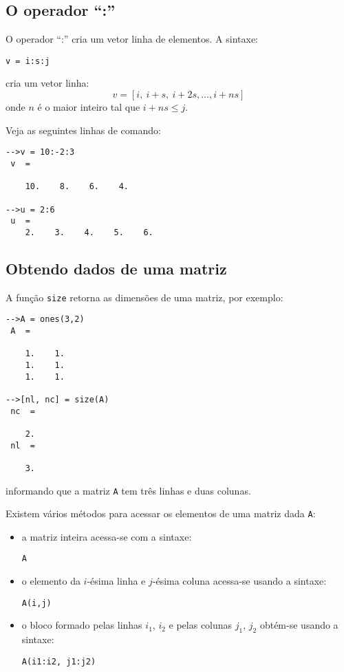 \subsection{O operador ``:''}

O operador ``:'' cria um vetor linha de elementos. A sintaxe:
\begin{verbatim}
v = i:s:j
\end{verbatim}
cria um vetor linha:
\begin{equation}
  v = [i,~i+s,~i+2s,\dotsc, i+ns]
\end{equation}
onde $n$ é o maior inteiro tal que $i + ns \leq j$.

\begin{ex}
Veja as seguintes linhas de comando:
\begin{verbatim}
-->v = 10:-2:3
 v  =
 
    10.    8.    6.    4.  
 
-->u = 2:6
 u  =
    2.    3.    4.    5.    6.
\end{verbatim}
\end{ex}

\subsection{Obtendo dados de uma matriz}

A função \verb+size+ retorna as dimensões de uma matriz, por exemplo:
\begin{verbatim}
-->A = ones(3,2)
 A  =
 
    1.    1.  
    1.    1.  
    1.    1.  
 
-->[nl, nc] = size(A)
 nc  =
 
    2.  
 nl  =
 
    3.  
\end{verbatim}
informando que a matriz \verb+A+ tem três linhas e duas colunas.

Existem vários métodos para acessar os elementos de uma matriz dada \verb+A+:
\begin{itemize}
\item a matriz inteira acessa-se com a sintaxe:
\begin{verbatim}
A
\end{verbatim}
\item o elemento da $i$-ésima linha e $j$-ésima coluna acessa-se usando a sintaxe:
\begin{verbatim}
A(i,j)
\end{verbatim}
\item o bloco formado pelas linhas $i_1$, $i_2$ e pelas colunas $j_1$, $j_2$ obtém-se usando a sintaxe:
\begin{verbatim}
A(i1:i2, j1:j2)
\end{verbatim}
\end{itemize}

